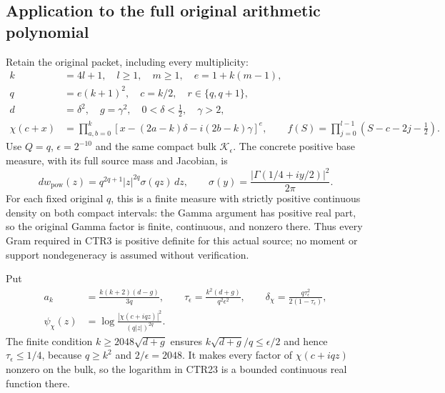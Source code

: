 \subsection{Application to the full original arithmetic polynomial}
Retain the original packet, including every multiplicity:
\[
 \begin{split}
 k&=4l+1,\quad l\geq1,\quad m\geq1,\quad e=1+k(m-1),\\
 q&=e(k+1)^2,\quad c=k/2,\quad r\in\{q,q+1\},\\
 d&=\delta^2,\quad g=\gamma^2,\quad 0<\delta<\tfrac12,\quad\gamma>2,\\
 \chi(c+x)&=\prod_{a,b=0}^k
       [x-(2a-k)\delta-i(2b-k)\gamma]^e,\qquad
 f(S)=\prod_{j=0}^{l-1}(S-c-2j-\tfrac12).
 \end{split}
 \tag{CTR21}
\]
Use $Q=q$, $\epsilon=2^{-10}$ and the same compact bulk
$\mathcal K_\epsilon$. The concrete positive base measure, with its full
source mass and Jacobian, is
\[
 dw_{\mathrm{pow}}(z)
   =q^{2q+1}|z|^{2q}\sigma(qz)\,dz,\qquad
 \sigma(y)=\frac{|\Gamma(1/4+iy/2)|^2}{2\pi}.
 \tag{CTR22}
\]
For each fixed original $q$, this is a finite measure with strictly
positive continuous density on both compact intervals: the Gamma
argument has positive real part, so the original Gamma factor is finite,
continuous, and nonzero there. Thus every Gram required in CTR3 is
positive definite for this actual source; no moment or support
nondegeneracy is assumed without verification.

Put
\[
 \begin{split}
 a_k&=\frac{k(k+2)(d-g)}{3q},\qquad
 \tau_\epsilon=\frac{k^2(d+g)}{q^2\epsilon^2},\qquad
 \delta_\chi=\frac{q\tau_\epsilon^2}{2(1-\tau_\epsilon)},\\
 \psi_\chi(z)&=\log\frac{|\chi(c+iqz)|^2}{(q|z|)^{2q}}.
 \end{split}
 \tag{CTR23}
\]
The finite condition $k\geq2048\sqrt{d+g}$ ensures
$k\sqrt{d+g}/q\leq\epsilon/2$ and hence $\tau_\epsilon\leq1/4$,
because $q\geq k^2$ and $2/\epsilon=2048$.
It makes every factor of $\chi(c+iqz)$ nonzero on the bulk, so the
logarithm in CTR23 is a bounded continuous real function there.

